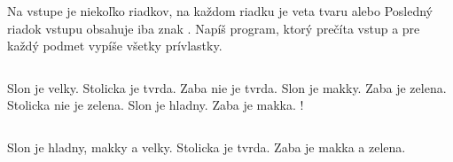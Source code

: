 \begin{uloha}
Na vstupe je niekoľko riadkov, na každom riadku je veta tvaru 
   alebo 
Posledný riadok vstupu obsahuje iba znak . Napíš program, ktorý prečíta 
vstup a pre každý podmet vypíše všetky prívlastky.


  
\begin{column}{0.45}
\begin{outputBox}
Slon je velky.
Stolicka je tvrda.
Zaba nie je tvrda.
Slon je makky.
Zaba je zelena.
Stolicka nie je zelena.
Slon je hladny.
Zaba je makka.
!
\end{outputBox}
\end{column}
\begin{column}{0.45}
\begin{outputBox}
Slon je hladny, makky a velky.
Stolicka je tvrda.
Zaba je makka a zelena.
\end{outputBox}
\end{column}
\end{uloha}

